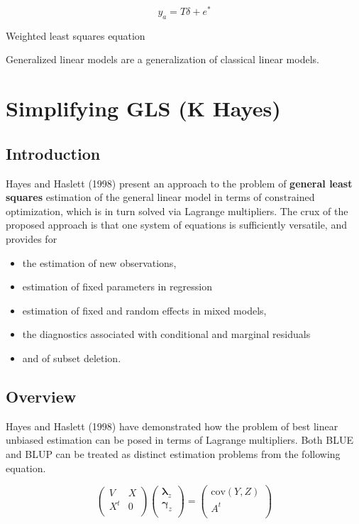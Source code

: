 \documentclass[12pt, a4paper]{article}
\begin{document}
\begin{equation}
y_{a} = T \delta + e^{*}
\end{equation}

Weighted least squares equation


\newpage


Generalized linear models are a generalization of classical linear  models.

\section{Simplifying GLS (K Hayes)}

\subsection{Introduction}

Hayes and Haslett (1998) present an approach to the problem of \textbf{general least squares} estimation of the general linear model in terms of constrained optimization, which is in turn solved via Lagrange multipliers. The crux of the proposed approach is that one system of equations is sufficiently versatile, and provides for \begin{itemize} \item the estimation of new observations, \item estimation of fixed parameters in regression \item estimation of fixed and random effects in mixed models,\item the diagnostics associated with conditional and marginal residuals \item and of subset deletion. \end{itemize}

\subsection{Overview}
Hayes and Haslett (1998) have demonstrated how the problem of best linear unbiased estimation can be posed in terms of Lagrange multipliers. Both BLUE and BLUP can be treated as distinct estimation problems from the following equation.

\begin{equation}
\left(  \begin{array}{cc} V & X \\    X^t & 0 \\
\end{array}\right)\left(  \begin{array}{c}    \boldsymbol{\lambda}_{z}\\   \boldsymbol{\gamma}_z \\  \end{array}
\right)=\left(  \begin{array}{c}    \mbox{cov}(Y,Z)\\   A^{t} \\  \end{array}\right)\end{equation}
\end{document}
